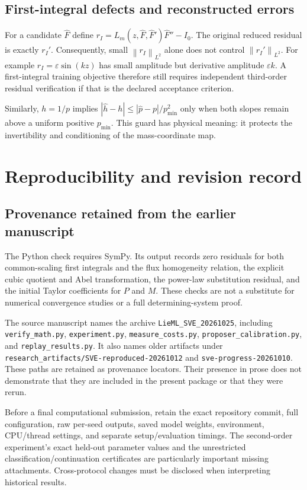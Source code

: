 \documentclass[11pt,a4paper,oneside]{report}
\numberwithin{equation}{chapter}
\newcommand{\norm}[1]{\left\lVert#1\right\rVert}
\DeclareRobustCommand{\code}[1]{\nolinkurl{#1}}
\begin{document}
\section{First-integral defects and reconstructed errors}
For a candidate $\widehat F$ define $r_I=L_m(z,\widehat F,\widehat F')\widehat F''-I_0$. The original reduced residual is exactly $r_I'$. Consequently, small $\norm{r_I}_{L^2}$ alone does not control $\norm{r_I'}_{L^2}$. For example $r_I=\varepsilon\sin(kz)$ has small amplitude but derivative amplitude $\varepsilon k$. A first-integral training objective therefore still requires independent third-order residual verification if that is the declared acceptance criterion.

Similarly, $h=1/p$ implies
$|\widehat h-h|\le|\widehat p-p|/p_{\min}^2$ only when both slopes remain above a uniform positive $p_{\min}$. This guard has physical meaning: it protects the invertibility and conditioning of the mass-coordinate map.

\chapter{Reproducibility and revision record}\label{app:repro}
\section{Provenance retained from the earlier manuscript}

The Python check requires SymPy. Its output records zero residuals for both common-scaling first integrals and the flux homogeneity relation, the explicit cubic quotient and Abel transformation, the power-law substitution residual, and the initial Taylor coefficients for $P$ and $M$. These checks are not a substitute for numerical convergence studies or a full determining-system proof.

The source manuscript \cite{projectdraft} names the archive \code{LieML_SVE_20261025}, including \code{verify_math.py}, \code{experiment.py}, \code{measure_costs.py}, \code{proposer_calibration.py}, and \code{replay_results.py}. It also names older artifacts under \code{research_artifacts/SVE-reproduced-20261012} and \code{sve-progress-20261010}. These paths are retained as provenance locators. Their presence in prose does not demonstrate that they are included in the present package or that they were rerun.

Before a final computational submission, retain the exact repository commit, full configuration, raw per-seed outputs, saved model weights, environment, CPU/thread settings, and separate setup/evaluation timings. The second-order experiment's exact held-out parameter values and the unrestricted classification/continuation certificates are particularly important missing attachments. Cross-protocol changes must be disclosed when interpreting historical results.
\end{document}
